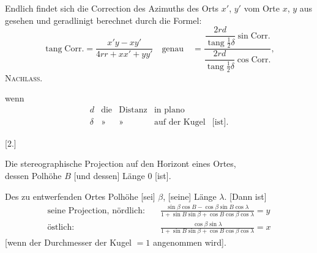 Endlich findet sich die Correction des Azimuths des Orts $x'$, $y'$ vom Orte $x$, $y$ aus gesehen und geradlinigt berechnet durch die Formel:
\[
\operatorname{tang}\mathrm{Corr.}=\frac{x'y-xy'}{4rr+xx'+yy'}\quad\text{genau}\quad=\frac{\dfrac{2rd}{\operatorname{tang}\frac12\delta}\sin\mathrm{Corr.}}{\dfrac{2rd}{\operatorname{tang}\frac12\delta}\cos\mathrm{Corr.}},
\]
\clearpage
{}\hfill\textsc{Nachlass.}\hfill\mbox{}\par\medskip
wenn
\[
\begin{array}{rcccl}
d&\text{die}&\text{Distanz}&\text{in plano}&\\
\delta&\text{»}&\text{»}&\text{auf der Kugel}&\text{[ist].}
\end{array}
\]
\bigskip
\begin{center}
[2.]\par\medskip
Die stereographische Projection auf den Horizont eines Ortes,\\dessen Polhöhe $B$ [und dessen] Länge $0$ [ist].
\end{center}
Des zu entwerfenden Ortes Polhöhe [sei] $\beta$, [seine] Länge $\lambda$. [Dann ist]
\[
\begin{aligned}
\text{seine Projection, nördlich:}\quad&\frac{\sin\beta\cos B-\cos\beta\sin B\cos\lambda}{1+\sin B\sin\beta+\cos B\cos\beta\cos\lambda}=y\\[6pt]
\text{östlich:}\quad&\frac{\cos\beta\sin\lambda}{1+\sin B\sin\beta+\cos B\cos\beta\cos\lambda}=x
\end{aligned}
\]
[wenn der Durchmesser der Kugel $=1$ angenommen wird].

